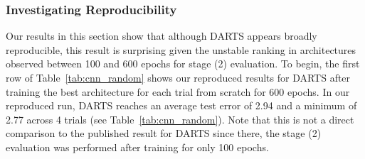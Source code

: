 \documentclass[acmlarge, nonacm]{acmart}
\begin{document}
\subsubsection{Investigating Reproducibility}
\label{ssec:cnn_reproduce}
Our results in this section show that although DARTS appears broadly reproducible, this result is surprising given the unstable ranking in architectures observed between 100 and 600 epochs for stage (2) evaluation.
To begin, the first row of Table~\ref{tab:cnn_random} shows our reproduced results for DARTS after training the best architecture for each trial from scratch for 600 epochs.  In our reproduced run, DARTS reaches an average test error of 2.94 and a minimum of 2.77 across 4 trials (see Table~\ref{tab:cnn_random}).  Note that this is not a direct comparison to the published result for DARTS since there, the stage (2) evaluation was performed after training for only 100 epochs.  
\begingroup
\setlength{\tabcolsep}{3pt}
\begin{table}[h]
    \centering
    \caption{\textbf{CIFAR-10 Benchmark: Ranking of Intermediate Test Error for DARTS.}  Architectures are retrained from scratch using the proxyless network and the error on the test set is reported after training for the indicated number of epochs.  Rank is calculated across the 4 trials.  We also show the average over 10 seeds for the best architecture from the top trial for reference.\\\hspace{\textwidth}
    $^\dagger$ These results were run before we fixed the non-determinism in DARTS code (see Appendix~\ref{ssec:appendix_reproduce}).}
    
    \label{tab:cnn_reproduce}
\end{table}
\endgroup
\end{document}
